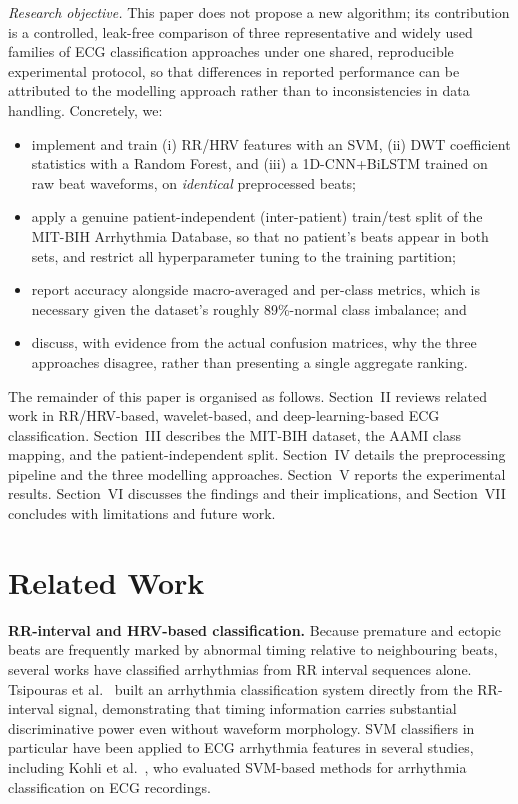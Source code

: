 \documentclass[conference]{IEEEtran}
\begin{document}
\textit{Research objective.} This paper does not propose a new algorithm;
its contribution is a controlled, leak-free comparison of three
representative and widely used families of ECG classification approaches
under one shared, reproducible experimental protocol, so that differences
in reported performance can be attributed to the modelling approach rather
than to inconsistencies in data handling. Concretely, we:
\begin{itemize}
\item implement and train (i) RR/HRV features with an SVM, (ii) DWT
  coefficient statistics with a Random Forest, and (iii) a 1D-CNN+BiLSTM
  trained on raw beat waveforms, on \emph{identical} preprocessed beats;
\item apply a genuine patient-independent (inter-patient) train/test split
  of the MIT-BIH Arrhythmia Database, so that no patient's beats appear in
  both sets, and restrict all hyperparameter tuning to the training
  partition;
\item report accuracy alongside macro-averaged and per-class metrics,
  which is necessary given the dataset's roughly 89\%-normal class
  imbalance; and
\item discuss, with evidence from the actual confusion matrices, why the
  three approaches disagree, rather than presenting a single
  aggregate ranking.
\end{itemize}

The remainder of this paper is organised as follows. Section~II reviews
related work in RR/HRV-based, wavelet-based, and deep-learning-based ECG
classification. Section~III describes the MIT-BIH dataset, the AAMI
class mapping, and the patient-independent split. Section~IV details the
preprocessing pipeline and the three modelling approaches. Section~V
reports the experimental results. Section~VI discusses the findings and
their implications, and Section~VII concludes with limitations and future
work.

\section{Related Work}

\textbf{RR-interval and HRV-based classification.} Because premature and
ectopic beats are frequently marked by abnormal timing relative to
neighbouring beats, several works have classified arrhythmias from RR
interval sequences alone. Tsipouras et al.~\cite{tsipouras2005arrhythmia}
built an arrhythmia classification system directly from the RR-interval
signal, demonstrating that timing information carries substantial
discriminative power even without waveform morphology. SVM classifiers in
particular have been applied to ECG arrhythmia features in several
studies, including Kohli et al.~\cite{kohli2010svm}, who evaluated
SVM-based methods for arrhythmia classification on ECG recordings.
\end{document}
